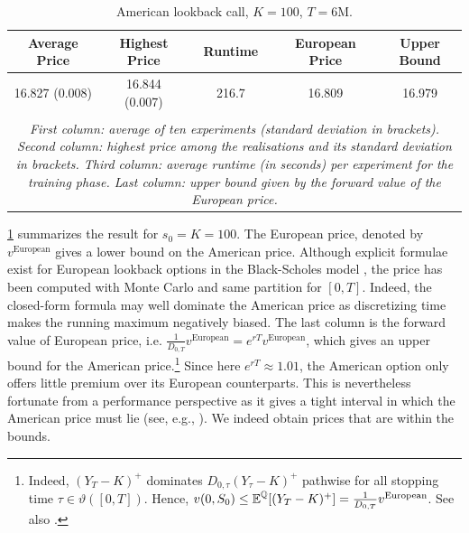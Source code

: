 \begin{table}[H]
  \centering
  \caption{American lookback call,  $K=100$, $T=6$M.
 }
 
 \vspace{-2mm}
 
  \begin{tabular}{ccccc}
 \hline \hline
    Average Price  & Highest Price & Runtime   & European Price & Upper Bound\\
  \hline  \hline 
  16.827   (0.008)  &  16.844 (0.007) & 216.7  &  16.809 & 16.979 \\
  \hline \\[-1em]
  \multicolumn{5}{c}{%
  \begin{minipage}{13cm}%
    \tiny \textit{First  column:  average  of ten experiments (standard deviation in brackets). Second column: highest price  among the realisations and its standard deviation in brackets.  Third column:  average runtime (in seconds) per experiment for the training phase.  Last column: upper bound given by the forward value of the European price. }%
  \end{minipage}%
}
\end{tabular}
\vspace{2mm}
\label{tab:resultLkbk}
  \end{table}
  
\cref{tab:resultLkbk} summarizes the result for $s_0=K=100$. The European price, denoted by $v^{\text{European}}$ gives a lower bound on the American price. Although explicit formulae exist for European lookback options in the Black-Scholes model \cite{Conze}, the price has been computed with Monte Carlo and same  partition for $[0,T]$. Indeed, the closed-form formula may well dominate the American price as discretizing time makes the %
running maximum  negatively biased. 
The  last  column is the  forward value of European price, i.e.  $\frac{1}{D_{0,T}}v^{\text{European}} = e^{rT}v^{\text{European}}$, which  gives an upper bound for the American price.\footnote{Indeed, $(Y_{T}-K)^{+}$ dominates  $D_{0,\tau}(Y_{\tau}-K)^{+}$ pathwise for all stopping time $\tau \in \vartheta([0,T])$. Hence, $ v(0,S_0) \le \operatorname{\mathbb{E}}^{\operatorname{\mathbb{Q}}}[(Y_{T}-K)^{+}] = \frac{1}{D_{0,T}}v^{\text{European}}$. See also \citet{Conze}. } Since here $e^{rT} \approx 1.01$, the American option only offers little premium over its European counterparts. This is nevertheless  fortunate from a performance perspective as it gives a tight interval in which the American price must lie (see, e.g., \cite{Conze}).  We indeed obtain prices that are within the bounds. %

